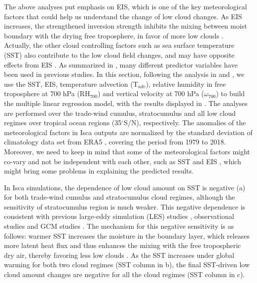 The above analyses put emphasis on EIS, which is one of the key meteorological factors that could help us understand the change of low cloud changes. As EIS increases, the strengthened inversion strength inhibits the mixing between moist boundary with the drying free troposphere, in favor of more low clouds \citep[e.g.,][]{Qu2014,Qu2015strength,Ceppi2017,Webb2018interactions,Scott2020}. Actually, the other cloud controlling factors such as sea surface temperature (SST) also contribute to the low cloud field changes, and may have opposite effects from EIS \citep[e.g.,][]{Bretherton2015,Myers2016,Scott2020,Myers2021,Cesana2021}. As summarized in \cite{Klein2017low}, many different predictor variables have been used in previous studies. In this section, following the analysis in \cite{Myers2016} and \cite{Zelinka2020causes}, we use the SST, EIS, temperature advection (T$_{adv}$), relative humidity in free troposphere at 700 hPa (RH$_{700}$) and vertical velocity at 700 hPa ($\omega_{700}$) to build the multiple linear regression model, with the results displayed in . The analyses are performed over the trade-wind cumulus, stratocumulus and all low cloud regimes over tropical ocean regions (35$^\circ$S/N), respectively. The anomalies of the meteorological factors in Isca outputs are normalized by the standard deviation of climatology data set from ERA5 \citep{era5}, covering the period from 1979 to 2018. Moreover, we need to keep in mind that some of the meteorological factors might co-vary and not be independent with each other, such as SST and EIS \citep{McCoy2017change}, which might bring some problems in explaining the predicted results.



In Isca simulations, the dependence of low cloud amount on SST is negative (a) for both trade-wind cumulus and stratocumulus cloud regimes, although the sensitivity of stratocumulus region is much weaker. This negative dependence is consistent with previous large-eddy simulation (LES) studies \citep[e.g.,][]{Bretherton2015}, observational studies \citep[e.g.,][]{Qu2015positive,Seethala2015,Scott2020,Myers2021} and GCM studies \citep[e.g.,][]{Myers2016}. The mechanism for this negative sensitivity is as follows: warmer SST increases the moisture in the boundary layer, which releases more latent heat flux and thus enhances the mixing with the free tropospheric dry air, thereby favoring less low clouds \citep{Qu2015positive,Scott2020}. As the SST increases under global warming for both two cloud regimes (SST column in b), the final SST-driven low cloud amount changes are negative for all the cloud regimes (SST column in c).

